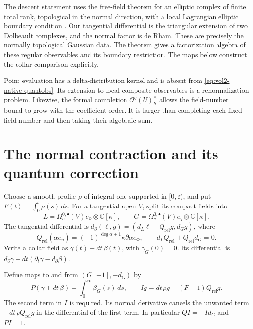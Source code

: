 The descent statement uses the free-field theorem for an elliptic complex
of finite total rank, topological in the normal direction, with a local
Lagrangian elliptic boundary condition
\cite[Definitions 2.1--2.3 and Theorems 4.1--4.2]{GwilliamRabinovichWilliams2021}.
Our tangential differential is the triangular extension of two Dolbeault
complexes, and the normal factor is de Rham. These are precisely the
normally topological Gaussian data. The theorem gives a factorization
algebra of these regular observables and its boundary restriction.
The maps below construct the collar comparison explicitly.

Point evaluation has a delta-distribution kernel and is absent from
\eqref{eq:vol2-native-quantobs}. Its extension to local composite
observables is a renormalization problem. Likewise, the formal completion
\(\mathcal O^q(U)^{\wedge}_{\hbar}\) allows the field-number bound to grow
with the coefficient order. It is larger than completing each fixed
field number and then taking their algebraic sum.

\section{The normal contraction and its quantum correction}

Choose a smooth profile \(\rho\) of integral one supported in
\([0,\varepsilon)\), and put \(F(t)=\int_0^t\rho(s)\,ds\).
For a tangential open \(V\), split its compact fields into
\[
 L=\Omega_c^{0,\bullet}(V)e_\Phi\otimes\mathbb C[\kappa],
 \qquad G=\Omega_c^{0,\bullet}(V)e_\eta\otimes\mathbb C[\kappa].
\]
The tangential differential is
\(d_\partial(\ell,g)=(d_L\ell+Q_{\mathrm{rel}}g,d_Gg)\), where
\[
 Q_{\mathrm{rel}}(\alpha e_\eta)
       =(-1)^{\deg\alpha+1}\kappa\partial\alpha e_\Phi,
 \qquad d_LQ_{\mathrm{rel}}+Q_{\mathrm{rel}}d_G=0.
\]
Write a collar field as \(\gamma(t)+dt\,\beta(t)\), with
\(\gamma_G(0)=0\). Its differential is
\(d_\partial\gamma+dt(\partial_t\gamma-d_\partial\beta)\).

Define maps to and from \((G[-1],-d_G)\) by
\begin{equation}\label{eq:vol2-native-normal-maps}
 P(\gamma+dt\,\beta)=\int_0^\infty\beta_G(s)\,ds,
 \qquad Ig=dt\,\rho g+(F-1)Q_{\mathrm{rel}}g.
\end{equation}
The second term in \(I\) is required. Its normal derivative cancels the
unwanted term \(-dt\,\rho Q_{\mathrm{rel}}g\) in the differential of the
first term. In particular \(QI=-Id_G\) and \(PI=1\).

